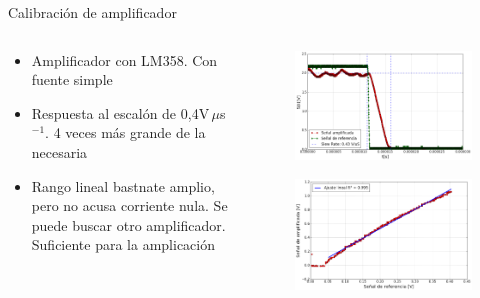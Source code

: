 \begin{frame}{Calibración de amplificador}

\begin{columns}[c]
    \begin{column}{0.4\textwidth}
        \begin{itemize}
        \item Amplificador con LM358. Con fuente simple
        \item Respuesta al escalón de 0,4V$\,\mu$s$^{-1}$. 4 veces más grande de la necesaria
        \item Rango lineal bastnate amplio, pero no acusa corriente nula. Se puede buscar otro amplificador. Suficiente para la amplicación
        \end{itemize}
    \end{column}
    \begin{column}{0.5\textwidth}
        \vspace{-1em}
        \begin{figure}[H]
            \centering
            \includegraphics[width=\textwidth]{fig/circuito/amp/transicion_amp}
            \label{fig:transicion_amp}
        \end{figure}
        \vspace{-2em}
        \begin{figure}[H]
            \centering
            \includegraphics[width=\textwidth]{fig/circuito/amp/lin_amp}
            \label{fig:circuito/amp/lin_amp}
        \end{figure}
    \end{column}
\end{columns}


\end{frame}
